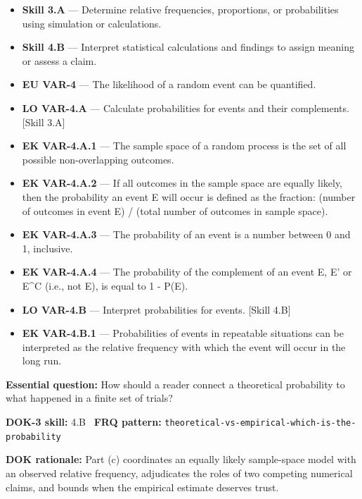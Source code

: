 \documentclass[11pt]{article}
\begin{document}


{\small
\begin{itemize}[leftmargin=1.5em,itemsep=2pt,topsep=2pt]
  \item \textbf{Skill 3.A} --- Determine relative frequencies, proportions, or probabilities using simulation or calculations.
  \item \textbf{Skill 4.B} --- Interpret statistical calculations and findings to assign meaning or assess a claim.
  \item \textbf{EU VAR-4} --- The likelihood of a random event can be quantified.
  \item \textbf{LO VAR-4.A} --- Calculate probabilities for events and their complements. [Skill 3.A]
  \item \textbf{EK VAR-4.A.1} --- The sample space of a random process is the set of all possible non-overlapping outcomes.
  \item \textbf{EK VAR-4.A.2} --- If all outcomes in the sample space are equally likely, then the probability an event E will occur is defined as the fraction: (number of outcomes in event E) / (total number of outcomes in sample space).
  \item \textbf{EK VAR-4.A.3} --- The probability of an event is a number between 0 and 1, inclusive.
  \item \textbf{EK VAR-4.A.4} --- The probability of the complement of an event E, E' or E\textasciicircum{}C (i.e., not E), is equal to 1 - P(E).
  \item \textbf{LO VAR-4.B} --- Interpret probabilities for events. [Skill 4.B]
  \item \textbf{EK VAR-4.B.1} --- Probabilities of events in repeatable situations can be interpreted as the relative frequency with which the event will occur in the long run.
\end{itemize}
}
\textbf{Essential question:} How should a reader connect a theoretical probability to what happened in a finite set of trials?\par
\textbf{DOK-3 skill:} 4.B \textperiodcentered\ \textbf{FRQ pattern:} {\small\texttt{theoretical-\allowbreak{}vs-\allowbreak{}empirical-\allowbreak{}which-\allowbreak{}is-\allowbreak{}the-\allowbreak{}probability}}\par
\textbf{DOK rationale:} Part (c) coordinates an equally likely sample-space model with an observed relative frequency, adjudicates the roles of two competing numerical claims, and bounds when the empirical estimate deserves trust.\par
\end{document}
